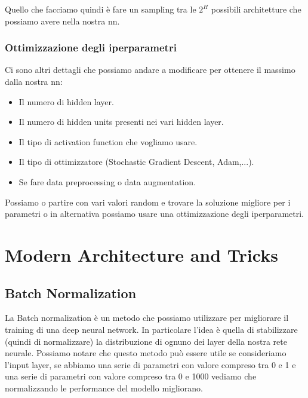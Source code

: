 \documentclass[14pt]{extreport}
\begin{document}
\begin{itemize}
\begin{figure}[H]
		\end{figure}
	Quello che facciamo quindi è fare un sampling tra le $2^H$ possibili architetture che possiamo avere nella nostra nn.
\end{itemize}

\subsubsection{Ottimizzazione degli iperparametri}

Ci sono altri dettagli che possiamo andare a modificare per ottenere il massimo dalla nostra nn:
\begin{itemize}
	\item Il numero di hidden layer.
	\item Il numero di hidden units presenti nei vari hidden layer.
	\item Il tipo di activation function che vogliamo usare.
	\item Il tipo di ottimizzatore (Stochastic Gradient Descent, Adam,...).
	\item Se fare data preprocessing o data augmentation.
	\end{itemize}

Possiamo o partire con vari valori random e trovare la soluzione migliore per i parametri o in alternativa possiamo usare una ottimizzazione degli iperparametri.

\section{Modern Architecture and Tricks}

\subsection{Batch Normalization}

La Batch normalization è un metodo che possiamo utilizzare per migliorare il training di
una deep neural network. In particolare l'idea è quella di stabilizzare (quindi di normalizzare) 
la distribuzione di ognuno dei layer della nostra rete neurale. Possiamo notare che questo metodo può
essere utile se consideriamo l'input layer, se abbiamo una serie di parametri con valore compreso tra 0 e 1 
e una serie di parametri con valore compreso tra 0 e 1000 vediamo che normalizzando le performance del modello migliorano.
\end{document}
